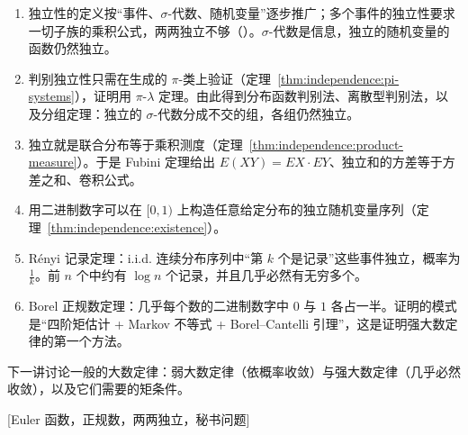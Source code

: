 
\begin{enumerate}
\item 独立性的定义按“事件、$\sigma$-代数、随机变量”逐步推广；多个事件的独立性要求一切子族的乘积公式，两两独立不够（）。$\sigma$-代数是信息，独立的随机变量的函数仍然独立。
\item 判别独立性只需在生成的 $\pi$-类上验证（定理~\ref{thm:independence:pi-systems}），证明用 $\pi$-$\lambda$ 定理。由此得到分布函数判别法、离散型判别法，以及分组定理：独立的 $\sigma$-代数分成不交的组，各组仍然独立。
\item 独立就是联合分布等于乘积测度（定理~\ref{thm:independence:product-measure}）。于是 Fubini 定理给出 $E(XY)=EX\cdot EY$、独立和的方差等于方差之和、卷积公式。
\item 用二进制数字可以在 $[0,1)$ 上构造任意给定分布的独立随机变量序列（定理~\ref{thm:independence:existence}）。
\item Rényi 记录定理：i.i.d. 连续分布序列中“第 $k$ 个是记录”这些事件独立，概率为 $\frac1k$。前 $n$ 个中约有 $\log n$ 个记录，并且几乎必然有无穷多个。
\item Borel 正规数定理：几乎每个数的二进制数字中 $0$ 与 $1$ 各占一半。证明的模式是“四阶矩估计 + Markov 不等式 + Borel--Cantelli 引理”，这是证明强大数定律的第一个方法。
\end{enumerate}
下一讲讨论一般的大数定律：弱大数定律（依概率收敛）与强大数定律（几乎必然收敛），以及它们需要的矩条件。

[Euler 函数，正规数，两两独立，秘书问题]
\label{hw:independence}


